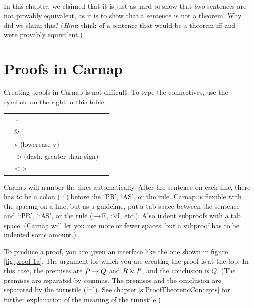 \

\problempart In this chapter, we claimed that it is just as hard to show that two sentences are not provably equivalent, as it is to show that a sentence is not a theorem. Why did we claim this? (\emph{Hint}: think of a sentence that would be a theorem iff  and  were provably equivalent.)




\chapter{Proofs in Carnap}\label{s:Carnap-proofs}

Creating proofs in Carnap is not difficult. To type the connectives, use the symbols on the right in this table. 

	\begin{table}[h]
	\center
	\begin{tabular}{p{1cm} l l}
	
	\hline
	\enot&$\sim$&\\
	\eand&\&&\\
	\eor&v (lowercase v)&\\
	\eif&-> (dash, greater than sign)&\\
	\eiff&<->&\\
	\hline
	\end{tabular}
	\end{table}

\noindent Carnap will number the lines automatically. After the sentence on each line, there has to be a colon (`:') before the `PR', `AS', or the rule. Carnap is flexible with the spacing on a line, but as a guideline, put a tab space between the sentence and `:PR', `:AS', or the rule (:$\rightarrow$E, :$\vee$I, etc.). Also indent subproofs with a tab space. (Carnap will let you use more or fewer spaces, but a subproof has to be indented some amount.)

To produce a proof, you are given an interface like the one shown in figure \ref{fig:proof-1a}. The argument for which you are creating the proof is at the top. In this case, the premises are $P \rightarrow Q$ and $R \mathbin{\&} P$, and the conclusion is $Q$. (The premises are separated by commas. The premises and the conclusion are separated by the turnstile (`$\vdash$'). See chapter \ref{s:ProofTheoreticConcepts} for further explanation of the meaning of the turnstile.)

